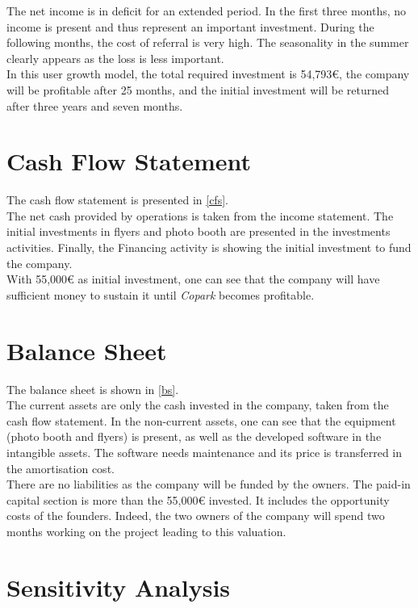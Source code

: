 \documentclass[12pt,a4paper,oneside]{book}
\newcommand{\bp}{\textit{Copark}}
\begin{document}
The net income is in deficit for an extended period. In the first three months, no income is present and thus represent an important investment. During the following months, the cost of referral is very high. The seasonality in the summer clearly appears as the loss is less important.\\

In this user growth model, the total required investment is 54,793\euro{}, the company will be profitable after 25 months, and the initial investment will be returned after three years and seven months.

\section{Cash Flow Statement}
The cash flow statement is presented in \autoref{cfs}.\\

The net cash provided by operations is taken from the income statement. The initial investments in flyers and photo booth are presented in the investments activities. Finally, the Financing activity is showing the initial investment to fund the company.\\

With 55,000\euro{} as initial investment, one can see that the company will have sufficient money to sustain it until \bp{} becomes profitable.

\section{Balance Sheet}
The balance sheet is shown in \autoref{bs}.\\

The current assets are only the cash invested in the company, taken from the cash flow statement. In the non-current assets, one can see that the equipment (photo booth and flyers) is present, as well as the developed software in the intangible assets. The software needs maintenance and its price is transferred in the amortisation cost.\\

There are no liabilities as the company will be funded by the owners. The paid-in capital section is more than the 55,000\euro{} invested. It includes the opportunity costs of the founders. Indeed, the two owners of the company will spend two months working on the project leading to this valuation.

\section{Sensitivity Analysis}
\end{document}
